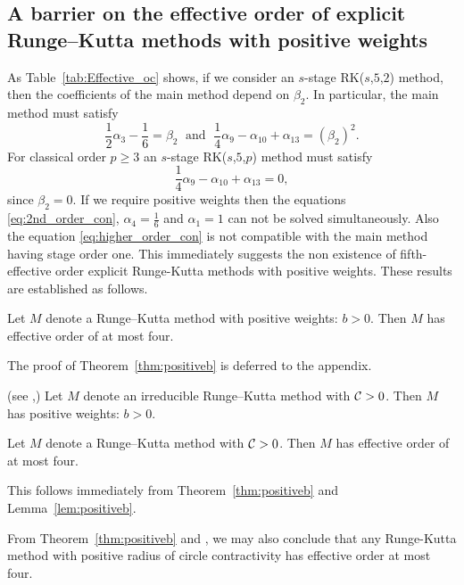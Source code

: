 \subsection{A barrier on the effective order of explicit Runge--Kutta methods with positive weights}\label{sec:ExRK_barrier}

As Table~\ref{tab:Effective_oc} shows, if we consider an $s$-stage
RK($s$,$5$,$2$) method, then the coefficients of the main method
depend on $\beta_2$.
In particular, the main method must satisfy
\begin{equation}\label{eq:2nd_order_con}
    \frac{1}{2}\alpha_3 - \frac{1}{6} = \beta_2 \; \text{ and } \; \frac{1}{4}\alpha_9 - \alpha_{10} + \alpha_{13} = (\beta_2)^2.
\end{equation}
For classical order $p \geq 3$ an $s$-stage RK($s$,$5$,$p$) method must satisfy
\begin{equation}\label{eq:higher_order_con}
    \frac{1}{4}\alpha_9- \alpha_{10} + \alpha_{13} = 0,
\end{equation}
since $\beta_2 = 0$.
If we require positive weights then the equations \eqref{eq:2nd_order_con},
$\alpha_4 = \frac{1}{6}$ and $\alpha_1 = 1$ can not be solved simultaneously.
Also the equation \eqref{eq:higher_order_con} is not compatible with the main method having stage order one.
This immediately suggests the non existence of fifth-effective order explicit Runge-Kutta methods with positive weights.
These results are established as follows.

\begin{theorem}\label{thm:positiveb}
    Let $M$ denote a Runge--Kutta method with positive weights: $b>0$.
    Then $M$ has effective order of at most four.
\end{theorem}
The proof of Theorem~\ref{thm:positiveb} is deferred to the appendix.

\begin{lemma}\label{lem:positiveb}(see \cite[Theorem~4.2]{Kraaijevanger1991},\cite[Lemma 4.2]{Ruuth2002})
Let $M$ denote an irreducible Runge--Kutta method with $\mathcal{C}>0$.  Then $M$ has positive weights:
$b>0$.
\end{lemma}

\begin{corollary}\label{cor:no-ssp-5}
    Let $M$ denote a Runge--Kutta method with $\mathcal{C}>0$.
    Then $M$ has effective order of at most four.
\end{corollary}
This follows immediately from Theorem~\ref{thm:positiveb} and Lemma~\ref{lem:positiveb}.

\begin{remark}
  From Theorem~\ref{thm:positiveb} and \cite[Theorem~4.1]{dahlquist2006}, we
  may also conclude that any Runge-Kutta method with positive radius of circle contractivity
  has effective order at most four.
\end{remark}


